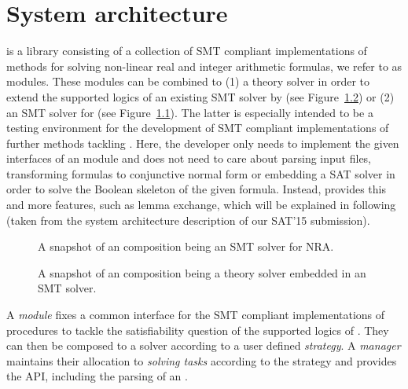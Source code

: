 \chapter{System architecture}
\label{chapter:generalframework}
\smtrat is a \Cpp library consisting of a collection of
SMT compliant implementations of methods for solving non-linear real
and integer arithmetic \supportedLogics formulas, we refer to as modules. These modules can be 
combined to (1) a theory solver in order to extend the supported logics of an
existing SMT solver by \supportedLogics (see Figure~\ref{fig:frameworkb}) or (2) an SMT 
solver for \supportedLogics (see Figure~\ref{fig:frameworka}). The latter is 
especially intended to be a testing environment for the development 
of SMT compliant implementations of further methods tackling \supportedLogics. Here,
the developer only needs to implement the given interfaces of an \smtrat 
module and does not need to care about parsing input files, transforming
formulas to conjunctive normal form or embedding a SAT solver in order
to solve the Boolean skeleton of the given formula. Instead, \smtrat
provides this and more features, such as lemma exchange, which will be explained in following (taken from the system architecture description of our SAT'15 submission).

\begin{figure}[ht]
\caption{A snapshot of an \smtrat composition being an SMT solver for NRA.}
\begin{center}

\end{center}
\label{fig:frameworka}
\end{figure}

\begin{figure}[ht]
\caption{A snapshot of an \smtrat composition being a theory solver embedded in an SMT solver.}
\begin{center}

\end{center}
\label{fig:frameworkb}
\end{figure}

A \emph{module} fixes a common interface for the SMT compliant implementations of procedures to tackle the satisfiability question of the supported logics of \smtrat. They can then be composed to a solver according to a user defined \emph{strategy}. A \emph{manager} maintains their allocation to \emph{solving tasks} according to the strategy and provides the API, including the parsing of an \smtlibfile.

